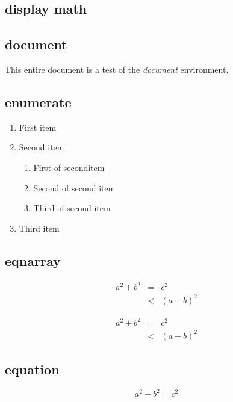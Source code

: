 \documentclass[11pt]{article}
\newcommand{\ifdisco}[2]{#2}
\begin{document}
\subsection{display math}%

\subsection{document}
This entire \ifdisco{page}{document} is a test of the \emph{document} environment.

\subsection{enumerate}
\begin{enumerate}
    \item First item
    \item Second item
        \begin{enumerate}
            \item First of seconditem
            \item Second of second item
            \item Third of second item
        \end{enumerate}

    \item Third item
\end{enumerate}













\subsection{eqnarray}
\begin{eqnarray}
    a^2+b^2 &=& c^2\\
    &<& (a+b)^2
\end{eqnarray}

\begin{eqnarray*}
    a^2+b^2 &=& c^2\\
    &<& (a+b)^2
\end{eqnarray*}

\subsection{equation}
\begin{equation}
    a^2+b^2 = c^2
\end{equation}
\end{document}
